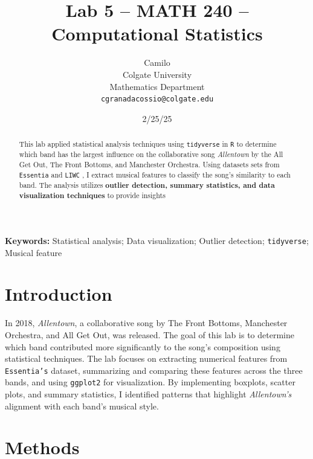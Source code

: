 \documentclass{article}\usepackage[]{graphicx}\usepackage[]{xcolor}
\begin{document}
\vspace{-1in}
\title{Lab 5 -- MATH 240 -- Computational Statistics}

\author{
  Camilo \\
  Colgate University  \\
  Mathematics Department  \\
  {\tt cgranadacossio@colgate.edu}
}

\date{2/25/25}

\maketitle

\begin{multicols}{2}
\begin{abstract}
This lab applied statistical analysis techniques using \texttt{tidyverse} \citep{tidyverse} in \texttt{R} to determine which band has the largest influence on the collaborative song \textit{Allentown} by the All Get Out, The Front Bottoms, and Manchester Orchestra. Using datasets sets from \texttt{Essentia} \citep{essentia} and \texttt{LIWC} \citep{liwc}, I extract musical features to classify the song's similarity to each band. The analysis utilizes \textbf{outlier detection, summary statistics, and data visualization techniques} to provide insights
\end{abstract}

\noindent \textbf{Keywords:} Statistical analysis; Data visualization; Outlier detection; \texttt{tidyverse}; Musical feature

\section{Introduction}

In 2018, \textit{Allentown}, a collaborative song by The Front Bottoms, Manchester Orchestra, and All Get Out, was released. The goal of this lab is to determine which band contributed more significantly to the song's composition using statistical techniques. The lab focuses on extracting numerical features from \texttt{Essentia's} dataset, summarizing and comparing these features across the three bands, and using \texttt{ggplot2} \citep{gg} for visualization. By implementing boxplots, scatter plots, and summary statistics, I identified patterns that highlight \textit{Allentown's} alignment with each band's musical style.


\section{Methods}


\end{multicols}
\end{document}
